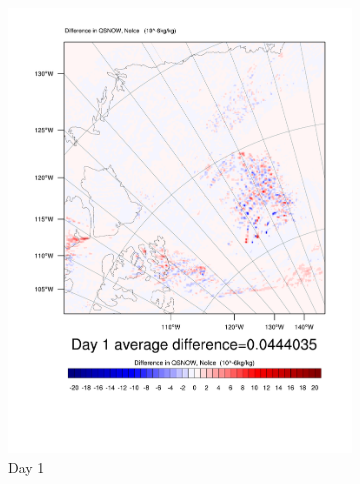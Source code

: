 \begin{figure}
\centering
	\begin{subfigure}{0.32\textwidth}
		\centering
		\includegraphics[width=\textwidth]{results/noice/diff_NoIce_qsnow_Day1.pdf}
		\caption{Day 1}
		\label{subfig:snowstory_Day1}
	\end{subfigure}
	\begin{subfigure}{0.32\textwidth}
		\centering

\end{subfigure}
\end{figure}

